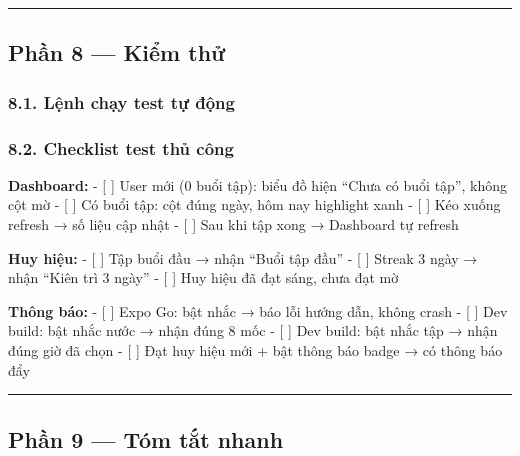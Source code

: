 \documentclass[12pt,a4paper]{article}
\begin{document}
\begin{center}\rule{0.5\linewidth}{0.5pt}\end{center}

\subsection{Phần 8 --- Kiểm thử}\label{phux1ea7n-8-kiux1ec3m-thux1eed}

\subsubsection{8.1. Lệnh chạy test tự
động}\label{lux1ec7nh-chux1ea1y-test-tux1ef1-ux111ux1ed9ng}

\begin{Shaded}
\begin{Highlighting}[]
\end{Highlighting}
\end{Shaded}

\subsubsection{8.2. Checklist test thủ
công}\label{checklist-test-thux1ee7-cuxf4ng}

\textbf{Dashboard:} - {[} {]} User mới (0 buổi tập): biểu đồ hiện ``Chưa
có buổi tập'', không cột mờ - {[} {]} Có buổi tập: cột đúng ngày, hôm
nay highlight xanh - {[} {]} Kéo xuống refresh → số liệu cập nhật - {[}
{]} Sau khi tập xong → Dashboard tự refresh

\textbf{Huy hiệu:} - {[} {]} Tập buổi đầu → nhận ``Buổi tập đầu'' - {[}
{]} Streak 3 ngày → nhận ``Kiên trì 3 ngày'' - {[} {]} Huy hiệu đã đạt
sáng, chưa đạt mờ

\textbf{Thông báo:} - {[} {]} Expo Go: bật nhắc → báo lỗi hướng dẫn,
không crash - {[} {]} Dev build: bật nhắc nước → nhận đúng 8 mốc - {[}
{]} Dev build: bật nhắc tập → nhận đúng giờ đã chọn - {[} {]} Đạt huy
hiệu mới + bật thông báo badge → có thông báo đẩy

\begin{center}\rule{0.5\linewidth}{0.5pt}\end{center}

\subsection{Phần 9 --- Tóm tắt
nhanh}\label{phux1ea7n-9-tuxf3m-tux1eaft-nhanh}
\end{document}
